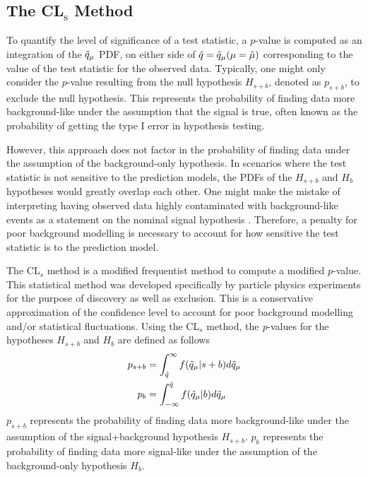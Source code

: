 \subsection{The CL$_{\mathrm{s}}$ Method}

To quantify the level of significance of a test statistic, a $p$-value is computed as an integration of the $\Tilde{q}_{\mu}$ PDF, on either side of $\hat{q} = \Tilde{q}_{\mu}(\mu = \hat{\mu}) $ corresponding to the value of the test statistic for the observed data.
Typically, one might only consider the $p$-value resulting from the null hypothesis $H_{s+b}$, denoted as $p_{s+b}$, to exclude the null hypothesis.
This represents the probability of finding data more background-like under the assumption that the signal is true, often known as the probability of getting the type I error in hypothesis testing.



However, this approach does not factor in the probability of finding data under the assumption of the background-only hypothesis.
In scenarios where the test statistic is not sensitive to the prediction models, the PDFs of the $H_{s+b}$ and $H_b$ hypotheses would greatly overlap each other.
One might make the mistake of interpreting having observed data highly contaminated with background-like events as a statement on the nominal signal hypothesis \cite{CLs_Read}.
Therefore, a penalty for poor background modelling is necessary to account for how sensitive the test statistic is to the prediction model.

The CL$_s$ method is a modified frequentist method to compute a modified $p$-value.
This statistical method was developed specifically by particle physics experiments for the purpose of discovery as well as exclusion. This is a conservative approximation of the confidence level to account for poor background modelling and/or statistical fluctuations.
Using the CL$_{s}$ method, the \textit{p}-values for the hypotheses $H_{s+b}$ and $H_b$ are defined as follows \cite{asymptotic_test, CLs_Junk, CLs_Read}
\begin{align}
\label{eq:psb}
    p_{s+b} & = \int_{\hat{q}}^{\infty} f(\Tilde{q}_\mu|s+b) d\Tilde{q}_\mu \\
\label{eq:pb}
    p_{b} & = \int^{\hat{q}}_{-\infty} f(\Tilde{q}_\mu|b) d\Tilde{q}_\mu
\end{align}
$p_{s+b}$ represents the probability of finding data more background-like under the assumption of the signal+background hypothesis $H_{s+b}$.
$p_b$ represents the probability of finding data more signal-like under the assumption of the background-only hypothesis $H_b$.

